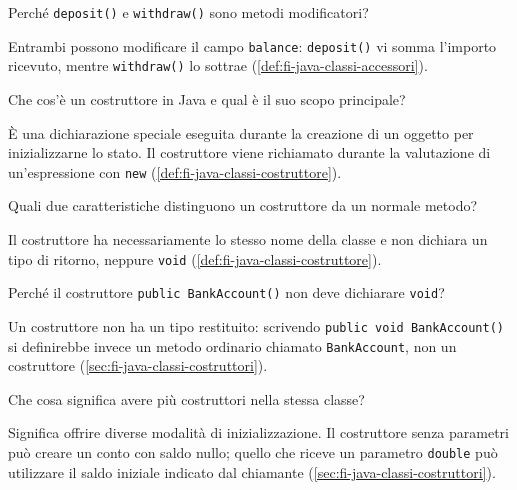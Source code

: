 \begin{exercise}
\label{ex:fi-esercizi-java-classi-deposit-withdraw}
Perché \texttt{deposit()} e \texttt{withdraw()} sono metodi modificatori?
\end{exercise}

Entrambi possono modificare il campo \texttt{balance}:
\texttt{deposit()} vi somma l'importo ricevuto, mentre
\texttt{withdraw()} lo sottrae
(\cref{def:fi-java-classi-accessori}).

\begin{exercise}
\label{ex:fi-esercizi-java-classi-costruttore}
Che cos'è un costruttore in Java e qual è il suo scopo principale?
\end{exercise}

È una dichiarazione speciale eseguita durante la creazione di
un oggetto per inizializzarne lo stato. Il costruttore viene
richiamato durante la valutazione di un'espressione con
\texttt{new} (\cref{def:fi-java-classi-costruttore}).

\begin{exercise}
\label{ex:fi-esercizi-java-classi-costruttore-differenze}
Quali due caratteristiche distinguono un costruttore da un normale metodo?
\end{exercise}

Il costruttore ha necessariamente lo stesso nome della classe e
non dichiara un tipo di ritorno, neppure \texttt{void}
(\cref{def:fi-java-classi-costruttore}).

\begin{exercise}
\label{ex:fi-esercizi-java-classi-costruttore-void}
Perché il costruttore \texttt{public BankAccount()} non deve dichiarare
\texttt{void}?
\end{exercise}

Un costruttore non ha un tipo restituito: scrivendo
\texttt{public void BankAccount()} si definirebbe invece
un metodo ordinario chiamato \texttt{BankAccount}, non un
costruttore (\cref{sec:fi-java-classi-costruttori}).

\begin{exercise}
\label{ex:fi-esercizi-java-classi-piu-costruttori}
Che cosa significa avere più costruttori nella stessa classe?
\end{exercise}

Significa offrire diverse modalità di inizializzazione.
Il costruttore senza parametri può creare un conto con saldo
nullo; quello che riceve un parametro \texttt{double}
può utilizzare il saldo iniziale indicato dal chiamante
(\cref{sec:fi-java-classi-costruttori}).

